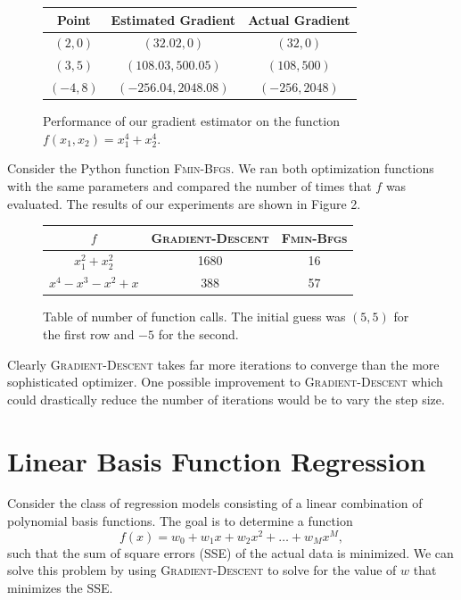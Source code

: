 \documentclass{sigchi}
\begin{document}
\begin{figure}
\def\arraystretch{1.4}

\begin{center}
\begin{tabular}{| c | c | c |}
\hline
Point & Estimated Gradient& Actual Gradient\\
\hline
$(2, 0)$& $(32.02, 0)$ & $(32, 0)$ \\
\hline
$(3, 5)$& $(108.03, 500.05)$ &$(108, 500)$\\
\hline
$(-4, 8)$&$(-256.04, 2048.08)$ & $(-256, 2048)$\\
\hline
\end{tabular}
\end{center}
\caption{Performance of our gradient estimator on the function $f(x_1, x_2) = x_1^4 + x_2^4$.}
\end{figure}


Consider the Python function \textsc{Fmin-Bfgs}. We ran both optimization functions with the same parameters and compared the number of times that $f$ was evaluated. The results of our experiments are shown in Figure 2.

\begin{figure}
\def\arraystretch{1.4}

\begin{center}
\begin{tabular}{| c | c | c |}
\hline
$f$ & \textsc{Gradient-Descent} & \textsc{Fmin-Bfgs}\\
\hline
$x_1^2 + x_2^2$ & 1680 & 16 \\
\hline
$x^4 - x^3 - x^2 + x$ & 388 & 57\\
\hline
\end{tabular}
\end{center}
\caption{Table of number of function calls. The initial guess was $(5, 5)$ for the first row and $-5$ for the second.}
\end{figure}

Clearly \textsc{Gradient-Descent} takes far more iterations to converge than the more sophisticated optimizer. One possible improvement to \textsc{Gradient-Descent} which could drastically reduce the number of iterations would be to vary the step size.


\section{Linear Basis Function Regression}

Consider the class of regression models consisting of a linear combination of polynomial basis functions. The goal is to determine a function
\[f(x) = w_0 + w_1x + w_2x^2 + \hdots + w_Mx^M,\]
such that the sum of square errors (SSE) of the actual data is minimized. We can solve this problem by using \textsc{Gradient-Descent} to solve for the value of $w$ that minimizes the SSE.
\end{document}
